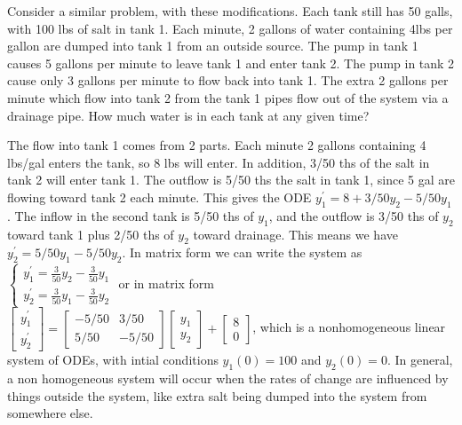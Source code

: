 Consider a similar problem, with these modifications.  Each tank still has 50 galls, with 100 lbs of salt in tank 1.  Each minute, 2 gallons of water containing 4lbs per gallon are dumped into tank 1 from an outside source. The pump in tank 1 causes 5 gallons per minute to leave tank 1 and enter tank 2.  The pump in tank 2 cause only 3 gallons per minute to flow back into tank 1. The extra 2 gallons per minute which flow into tank 2 from the tank 1 pipes flow out of the system via a drainage pipe.  How much water is in each tank at any given time?

The flow into tank 1 comes from 2 parts. Each minute 2 gallons containing 4 lbs/gal enters the tank, so 8 lbs will enter.  In addition, 3/50 ths of the salt in tank 2 will enter tank 1.  The outflow is 5/50 ths the salt in tank 1, since 5 gal are flowing toward tank 2 each minute.  This gives the ODE $y_1^\prime = 8+3/50 y_2 - 5/50 y_1$.  The inflow in the second tank is 5/50 ths of $y_1$, and the outflow is 3/50 ths of $y_2$ toward tank 1 plus 2/50 ths of $y_2$ toward drainage.  This means we have $y_2^\prime = 5/50 y_1 -5/50 y_2$.  In matrix form we can write the system as 
$\begin{cases}
y_1^\prime = \frac{3}{50}y_2 - \frac{3}{50}y_1\\
y_2^\prime = \frac{3}{50}y_1 - \frac{3}{50}y_2
\end{cases}$ or in matrix form 
$
\begin{bmatrix}
y_1^\prime\\
y_2^\prime
\end{bmatrix}
=
\begin{bmatrix}
-5/50&3/50\\
5/50&-5/50
\end{bmatrix}
\begin{bmatrix}
y_1\\
y_2
\end{bmatrix}
+
\begin{bmatrix}
8\\
0
\end{bmatrix}$, which is a nonhomogeneous linear system of ODEs, with intial conditions $y_1(0)=100$ and $y_2(0)=0$.  In general, a non homogeneous system will occur when the rates of change are influenced by things outside the system, like extra salt being dumped into the system from somewhere else.

